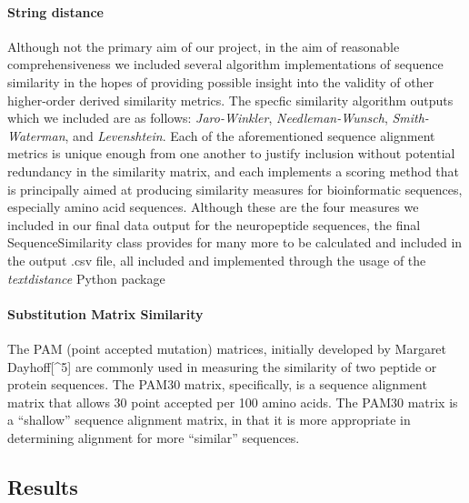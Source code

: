 \documentclass[]{article}
\let\oldparagraph\paragraph
\renewcommand{\paragraph}[1]{\oldparagraph{#1}\mbox{}}
\begin{document}
\hypertarget{string-distance}{%
\paragraph{String distance}\label{string-distance}}

Although not the primary aim of our project, in the aim of reasonable comprehensiveness we included several algorithm implementations of sequence similarity in the hopes of providing possible insight into the validity of other higher-order derived similarity metrics. The specfic similarity algorithm outputs which we included are as follows: \emph{Jaro-Winkler}, \emph{Needleman-Wunsch}, \emph{Smith-Waterman}, and \emph{Levenshtein}. Each of the aforementioned sequence alignment metrics is unique enough from one another to justify inclusion without potential redundancy in the similarity matrix, and each implements a scoring method that is principally aimed at producing similarity measures for bioinformatic sequences, especially amino acid sequences. Although these are the four measures we included in our final data output for the neuropeptide sequences, the final SequenceSimilarity class provides for many more to be calculated and included in the output .csv file, all included and implemented through the usage of the \emph{textdistance} Python package \cite{omnium_textdistance_2019}

\hypertarget{substitution-matrix-similarity}{%
\paragraph{Substitution Matrix Similarity}\label{substitution-matrix-similarity}}

The PAM (point accepted mutation) matrices, initially developed by Margaret Dayhoff{[}\^{}5{]} are commonly used in measuring the similarity of two peptide or protein sequences. The PAM30 matrix, specifically, is a sequence alignment matrix that allows 30 point accepted per 100 amino acids. The PAM30 matrix is a ``shallow'' sequence alignment matrix, in that it is more appropriate in determining alignment for more ``similar'' sequences.

\hypertarget{results}{%
\subsection{Results}\label{results}}
\end{document}
